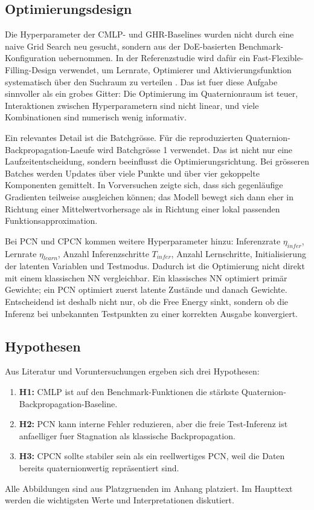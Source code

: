 \subsection{Optimierungsdesign}

Die Hyperparameter der CMLP- und GHR-Baselines wurden nicht durch eine naive Grid Search neu gesucht, sondern aus der DoE-basierten Benchmark-Konfiguration uebernommen. In der Referenzstudie wird dafür ein Fast-Flexible-Filling-Design verwendet, um Lernrate, Optimierer und Aktivierungsfunktion systematisch über den Suchraum zu verteilen \cite{bill2023comparison}. Das ist fuer diese Aufgabe sinnvoller als ein grobes Gitter: Die Optimierung im Quaternionraum ist teuer, Interaktionen zwischen Hyperparametern sind nicht linear, und viele Kombinationen sind numerisch wenig informativ.

Ein relevantes Detail ist die Batchgrösse. Für die reproduzierten Quaternion-Backpropagation-Laeufe wird Batchgrösse 1 verwendet. Das ist nicht nur eine Laufzeitentscheidung, sondern beeinflusst die Optimierungsrichtung. Bei grösseren Batches werden Updates über viele Punkte und über vier gekoppelte Komponenten gemittelt. In Vorversuchen zeigte sich, dass sich gegenläufige Gradienten teilweise ausgleichen können; das Modell bewegt sich dann eher in Richtung einer Mittelwertvorhersage als in Richtung einer lokal passenden Funktionsapproximation.

Bei PCN und CPCN kommen weitere Hyperparameter hinzu: Inferenzrate $\eta_{infer}$, Lernrate $\eta_{learn}$, Anzahl Inferenzschritte $T_{infer}$, Anzahl Lernschritte, Initialisierung der latenten Variablen und Testmodus. Dadurch ist die Optimierung nicht direkt mit einem klassischen NN vergleichbar. Ein klassisches NN optimiert primär Gewichte; ein PCN optimiert zuerst latente Zustände und danach Gewichte. Entscheidend ist deshalb nicht nur, ob die Free Energy sinkt, sondern ob die Inferenz bei unbekannten Testpunkten zu einer korrekten Ausgabe konvergiert.

\subsection{Hypothesen}

Aus Literatur und Voruntersuchungen ergeben sich drei Hypothesen:

\begin{enumerate}
    \item \textbf{H1:} CMLP ist auf den Benchmark-Funktionen die stärkste Quaternion-Backpropagation-Baseline.
    \item \textbf{H2:} PCN kann interne Fehler reduzieren, aber die freie Test-Inferenz ist anfaelliger fuer Stagnation als klassische Backpropagation.
    \item \textbf{H3:} CPCN sollte stabiler sein als ein reellwertiges PCN, weil die Daten bereits quaternionwertig repräsentiert sind.
\end{enumerate}

Alle Abbildungen sind aus Platzgruenden im Anhang platziert. Im Haupttext werden die wichtigsten Werte und Interpretationen diskutiert.
